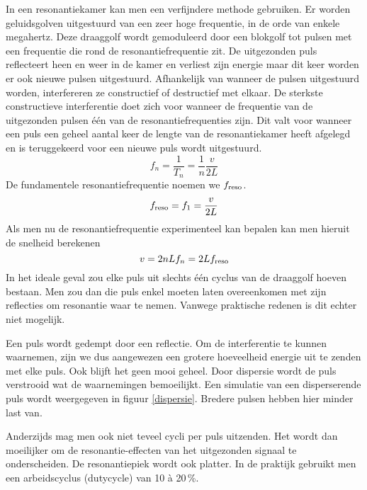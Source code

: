In een resonantiekamer kan men een verfijndere methode gebruiken. Er worden 
geluidsgolven uitgestuurd van een zeer hoge frequentie, in de orde van enkele 
megahertz. Deze draaggolf wordt gemoduleerd door een blokgolf tot pulsen met 
een frequentie die rond de resonantiefrequentie zit. De uitgezonden puls 
reflecteert heen en weer in de kamer en verliest zijn energie maar dit keer 
worden er ook nieuwe pulsen uitgestuurd. Afhankelijk van wanneer de pulsen 
uitgestuurd worden, interfereren ze constructief of destructief met elkaar. De 
sterkste constructieve interferentie doet zich voor wanneer de frequentie van 
de uitgezonden pulsen \'e\'en van de resonantiefrequenties zijn. Dit valt voor 
wanneer een puls een geheel aantal keer de lengte van de resonantiekamer heeft 
afgelegd en is teruggekeerd voor een nieuwe puls wordt uitgestuurd.
\begin{equation}
\label{resfreq}
f_n = \frac{1}{T_n} = \frac{1}{n} \frac{v}{2L}
\end{equation}
De fundamentele resonantiefrequentie noemen we $f_\mathrm{reso}$.
$$
f_\mathrm{reso} = f_1 = \frac{v}{2L}
$$
Als men nu de resonantiefrequentie experimenteel kan bepalen kan men hieruit de 
snelheid berekenen
\begin{equation}
\label{v-ifv-f}
v = 2nLf_n = 2L f_\mathrm{reso}
\end{equation}
In het ideale geval zou elke puls uit slechts \'e\'en cyclus van de draaggolf 
hoeven bestaan. Men zou dan die puls enkel moeten laten overeenkomen met zijn 
reflecties om resonantie waar te nemen. Vanwege praktische redenen is dit 
echter niet mogelijk.

Een puls wordt gedempt door een reflectie. Om de interferentie te kunnen 
waarnemen, zijn we dus aangewezen een grotere hoeveelheid energie uit te zenden 
met elke puls. Ook blijft het geen mooi geheel. Door dispersie wordt de puls 
verstrooid wat de waarnemingen bemoeilijkt. Een simulatie van een disperserende 
puls wordt weergegeven in figuur \ref{dispersie}. Bredere pulsen hebben hier 
minder last van.


Anderzijds mag men ook niet teveel cycli per puls uitzenden. Het wordt dan 
moeilijker om de resonantie-effecten van het uitgezonden signaal te 
onderscheiden. De resonantiepiek wordt ook platter. In de praktijk gebruikt men 
een arbeidscyclus (dutycycle) van 10 \`a 20\,\%.




